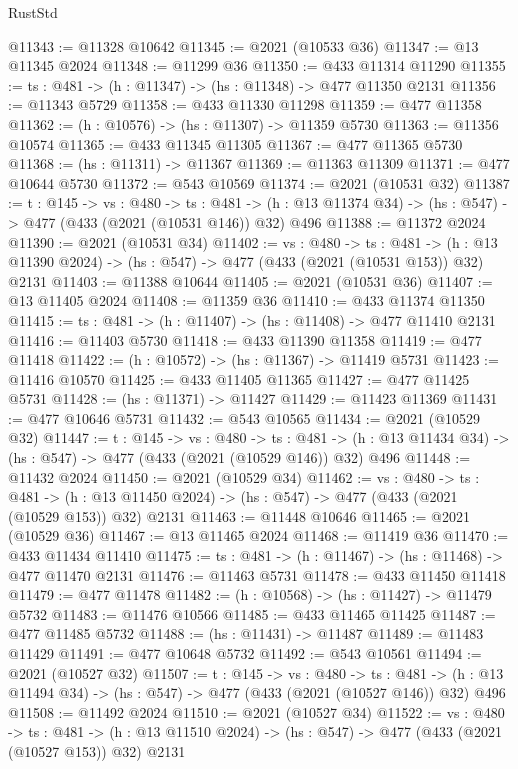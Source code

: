 \begin{lexlean}{RustStd}
\begin{coremodule}
{\begin{coremodule}
{{{{{{{{{{{{{{{{@11343 := @11328 @10642
@11345 := @2021 (@10533 @36)
@11347 := @13 @11345 @2024
@11348 := @11299 @36
@11350 := @433 @11314 @11290
@11355 := {ts : @481} -> (h : @11347) -> (hs : @11348) -> @477 @11350 @2131
@11356 := @11343 @5729
@11358 := @433 @11330 @11298
@11359 := @477 @11358
@11362 := (h : @10576) -> (hs : @11307) -> @11359 @5730
@11363 := @11356 @10574
@11365 := @433 @11345 @11305
@11367 := @477 @11365 @5730
@11368 := (hs : @11311) -> @11367
@11369 := @11363 @11309
@11371 := @477 @10644 @5730
@11372 := @543 @10569
@11374 := @2021 (@10531 @32)
@11387 := {t : @145} ->
  {vs : @480} ->
  {ts : @481} -> (h : @13 @11374 @34) -> (hs : @547) -> @477 (@433 (@2021 (@10531 @146)) @32) @496
@11388 := @11372 @2024
@11390 := @2021 (@10531 @34)
@11402 := {vs : @480} ->
  {ts : @481} ->
  (h : @13 @11390 @2024) -> (hs : @547) -> @477 (@433 (@2021 (@10531 @153)) @32) @2131
@11403 := @11388 @10644
@11405 := @2021 (@10531 @36)
@11407 := @13 @11405 @2024
@11408 := @11359 @36
@11410 := @433 @11374 @11350
@11415 := {ts : @481} -> (h : @11407) -> (hs : @11408) -> @477 @11410 @2131
@11416 := @11403 @5730
@11418 := @433 @11390 @11358
@11419 := @477 @11418
@11422 := (h : @10572) -> (hs : @11367) -> @11419 @5731
@11423 := @11416 @10570
@11425 := @433 @11405 @11365
@11427 := @477 @11425 @5731
@11428 := (hs : @11371) -> @11427
@11429 := @11423 @11369
@11431 := @477 @10646 @5731
@11432 := @543 @10565
@11434 := @2021 (@10529 @32)
@11447 := {t : @145} ->
  {vs : @480} ->
  {ts : @481} -> (h : @13 @11434 @34) -> (hs : @547) -> @477 (@433 (@2021 (@10529 @146)) @32) @496
@11448 := @11432 @2024
@11450 := @2021 (@10529 @34)
@11462 := {vs : @480} ->
  {ts : @481} ->
  (h : @13 @11450 @2024) -> (hs : @547) -> @477 (@433 (@2021 (@10529 @153)) @32) @2131
@11463 := @11448 @10646
@11465 := @2021 (@10529 @36)
@11467 := @13 @11465 @2024
@11468 := @11419 @36
@11470 := @433 @11434 @11410
@11475 := {ts : @481} -> (h : @11467) -> (hs : @11468) -> @477 @11470 @2131
@11476 := @11463 @5731
@11478 := @433 @11450 @11418
@11479 := @477 @11478
@11482 := (h : @10568) -> (hs : @11427) -> @11479 @5732
@11483 := @11476 @10566
@11485 := @433 @11465 @11425
@11487 := @477 @11485 @5732
@11488 := (hs : @11431) -> @11487
@11489 := @11483 @11429
@11491 := @477 @10648 @5732
@11492 := @543 @10561
@11494 := @2021 (@10527 @32)
@11507 := {t : @145} ->
  {vs : @480} ->
  {ts : @481} -> (h : @13 @11494 @34) -> (hs : @547) -> @477 (@433 (@2021 (@10527 @146)) @32) @496
@11508 := @11492 @2024
@11510 := @2021 (@10527 @34)
@11522 := {vs : @480} ->
  {ts : @481} ->
  (h : @13 @11510 @2024) -> (hs : @547) -> @477 (@433 (@2021 (@10527 @153)) @32) @2131
}}}}}}}}}}}}}}}}
\end{coremodule}}
\end{coremodule}
\end{lexlean}

